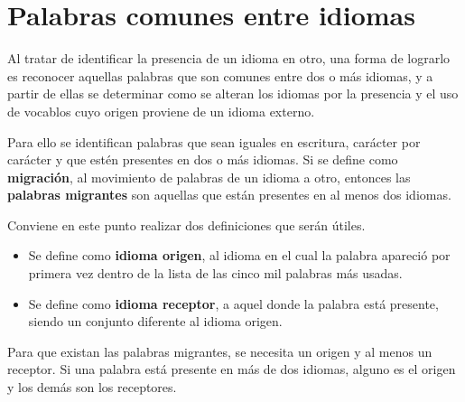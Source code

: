 \section{Palabras comunes entre idiomas} %

Al tratar de identificar la presencia de un idioma en otro, una forma
de lograrlo es reconocer aquellas palabras que son comunes entre dos o más
idiomas, y a partir de ellas se determinar como se alteran los idiomas por la presencia y el uso de vocablos cuyo origen proviene de un idioma externo. 

Para ello se identifican palabras que sean iguales en escritura, carácter por carácter y que estén presentes en dos o más idiomas.  Si se define como \textbf{migración}, al movimiento de palabras de un idioma a otro, entonces las \textbf{palabras migrantes}  son aquellas que están presentes en al menos dos idiomas.  

Conviene en este punto realizar dos definiciones que serán útiles.
\begin{itemize}
\item 
Se define como  \textbf{idioma origen}, al idioma en el cual la palabra
apareció por primera vez dentro de la lista de las cinco mil palabras más
usadas.  
\item 
Se define como \textbf{idioma receptor}, a  aquel donde la palabra está
presente, siendo un conjunto diferente al idioma origen.  
\end{itemize}

Para que existan las palabras migrantes, se necesita un origen y al menos un
receptor. Si una palabra está presente en más de dos idiomas, alguno es el
origen y los demás son los receptores. 

